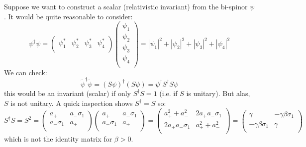 \documentclass[12pt]{book}
\begin{document}
Suppose we want to construct a scalar (relativistic invariant) from the bi-spinor $\psi$. It would be quite reasonable to consider:
$$\psi^\dagger \psi = 
\begin{pmatrix}
\psi_1^* & \psi_2^* & \psi_3^* & \psi_4^* \\
\end{pmatrix}
\begin{pmatrix}
\psi_1 \\ \psi_2 \\ \psi_3 \\ \psi_4 \\
\end{pmatrix}
= |\psi_1|^2 + |\psi_2|^2+ |\psi_3|^2 + |\psi_4|^2
$$
We can check:
$$\widetilde{\psi}^\dagger \widetilde{\psi} = 
(S \psi)^\dagger (S \psi) = \psi^\dagger S^\dagger S \psi$$ 
this would be an invariant (scalar) if only $S^\dagger S = 1$ (i.e. if $S$ is unitary).  But alas, $S$ is not unitary.  A quick inspection shows $S^\dagger = S$ so:
$$S^\dagger S = S^2 = 
\begin{pmatrix}
a_+ & a_- \sigma_1 \\
a_- \sigma_1 & a_+ \\
\end{pmatrix}
\begin{pmatrix}
a_+ & a_- \sigma_1 \\
a_- \sigma_1 & a_+ \\
\end{pmatrix}
=
\begin{pmatrix}
a_+^2+a_-^2        & 2 a_+ a_- \sigma_1 \\
2 a_+ a_- \sigma_1 & a_+^2+a_-^2 \\
\end{pmatrix}
=
\begin{pmatrix}
\gamma        & -\gamma \beta \sigma_1 \\
-\gamma \beta \sigma_1 & \gamma \\
\end{pmatrix}
$$
which is not the identity matrix for $\beta > 0$.
\end{document}
